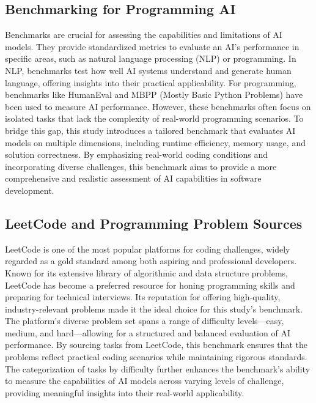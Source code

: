 \subsection{Benchmarking for Programming AI}

Benchmarks are crucial for assessing the capabilities and limitations of AI models. They provide standardized metrics to evaluate an AI's performance in specific areas, such as natural language processing (NLP) or programming. In NLP, benchmarks test how well AI systems understand and generate human language, offering insights into their practical applicability. For programming, benchmarks like HumanEval and MBPP (Mostly Basic Python Problems) have been used to measure AI performance. However, these benchmarks often focus on isolated tasks that lack the complexity of real-world programming scenarios. To bridge this gap, this study introduces a tailored benchmark that evaluates AI models on multiple dimensions, including runtime efficiency, memory usage, and solution correctness. By emphasizing real-world coding conditions and incorporating diverse challenges, this benchmark aims to provide a more comprehensive and realistic assessment of AI capabilities in software development.

\subsection{LeetCode and Programming Problem Sources}
LeetCode is one of the most popular platforms for coding challenges, widely regarded as a gold standard among both aspiring and professional developers. Known for its extensive library of algorithmic and data structure problems, LeetCode has become a preferred resource for honing programming skills and preparing for technical interviews. Its reputation for offering high-quality, industry-relevant problems made it the ideal choice for this study’s benchmark. The platform’s diverse problem set spans a range of difficulty levels—easy, medium, and hard—allowing for a structured and balanced evaluation of AI performance. By sourcing tasks from LeetCode, this benchmark ensures that the problems reflect practical coding scenarios while maintaining rigorous standards. The categorization of tasks by difficulty further enhances the benchmark's ability to measure the capabilities of AI models across varying levels of challenge, providing meaningful insights into their real-world applicability.

